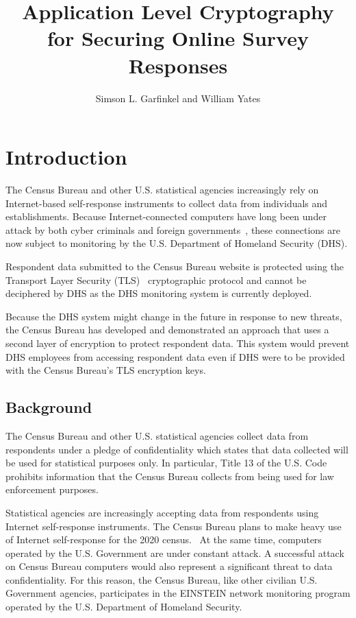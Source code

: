 \documentclass[fleqn,10pt]{wlscirep}
\title{Application Level Cryptography for Securing Online Survey Responses}
\author{Simson L. Garfinkel and William Yates}
\begin{document}
\maketitle

\section{Introduction}

The Census Bureau and other U.S. statistical agencies increasingly
rely on Internet-based self-response instruments to collect
data from individuals and establishments. Because Internet-connected
computers have long been under attack by both cyber criminals and
foreign governments~\cite{dick-testimony}, these connections are now
subject to monitoring by the U.S. Department of Homeland
Security (DHS).

Respondent data submitted to the Census Bureau website is protected
using the Transport Layer Security (TLS)~\cite{rfc8446} cryptographic
protocol and cannot be deciphered by DHS as the DHS monitoring system
is currently deployed.

Because the DHS system might change in the future in response to
new threats, the Census Bureau has developed and demonstrated an
approach that uses a second layer of encryption to protect respondent
data. This system would prevent DHS employees from accessing
respondent data even if DHS were to be provided with the Census
Bureau's TLS encryption keys.

\subsection{Background}

The Census Bureau and other U.S. statistical agencies collect
data from respondents under a pledge of confidentiality which states
that data collected will be used for statistical purposes
only. In particular, Title 13 of the U.S. Code prohibits information
that the Census Bureau collects from being used for law enforcement
purposes.

Statistical agencies are increasingly accepting data from respondents
using Internet self-response instruments. The Census
Bureau plans to make heavy use of Internet self-response for the 2020
census.~\cite{pennington2016} 
At the same time, computers operated by the U.S. Government are under
constant attack. A successful attack on Census Bureau computers would
also represent a significant threat to data confidentiality. For this
reason, the Census Bureau, like other civilian U.S. Government 
agencies, participates in the EINSTEIN network monitoring program
operated by the U.S. Department of Homeland Security.~\cite{thompson-feb2017}
\end{document}
